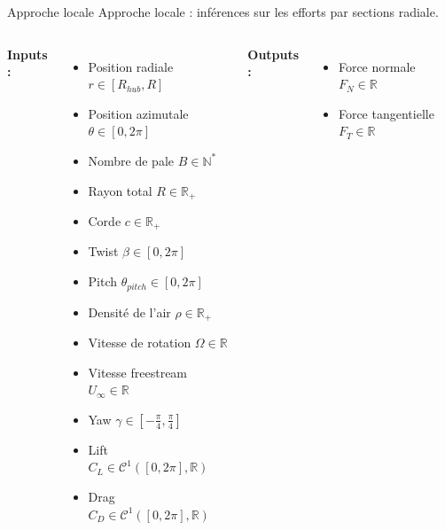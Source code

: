 \documentclass[
11pt,notheorems,hyperref={pdfauthor=whatever}
]{beamer}
\begin{document}
\begin{frame}{Approche locale}
    Approche locale : inférences sur les efforts par sections radiale. 

    \vspace{0.3cm}

    \begin{columns}[c]
        \textbf{Inputs :}
        \begin{itemize}\small
            \item Position radiale $r \in \left[R_{hub}, R\right]$
            \item Position azimutale $\theta \in \left[0,2\pi\right]$
            \item Nombre de pale $B \in \mathbb{N^*}$
            \item Rayon total $R\in \mathbb{R_+}$
            \item Corde $c\in \mathbb{R_+}$
            \item Twist $\beta \in \left[0,2\pi\right]$
            \item Pitch $\theta_{pitch} \in \left[0,2\pi\right]$
            \item Densité de l'air $\rho \in \mathbb{R_+}$
            \item Vitesse de rotation $\Omega \in \mathbb{R}$
            \item Vitesse freestream $U_{\infty} \in \mathbb{R}$
            \item Yaw $\gamma \in \left[-\frac{\pi}{4}, \frac{\pi}{4}\right]$
            \item Lift $C_L \in \mathcal{C^1}(\left[0,2\pi\right], \mathbb{R})$
            \item Drag $C_D \in \mathcal{C^1}(\left[0,2\pi\right], \mathbb{R})$
        \end{itemize}

        \centering

        \textbf{Outputs :}
        \begin{itemize}\small
            \item Force normale $F_N \in \mathbb{R}$
            \item Force tangentielle $F_T \in \mathbb{R}$
        \end{itemize}
    \end{columns}

\end{frame}
\end{document}
